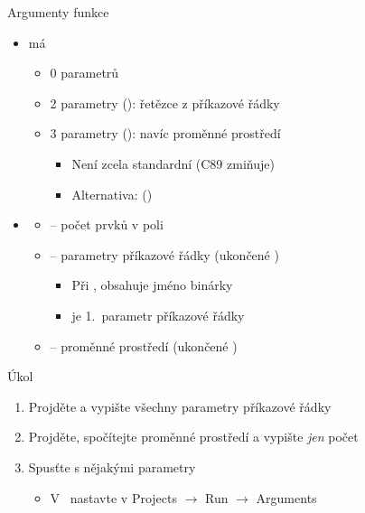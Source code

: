 \begin{frame}{Argumenty funkce }

  \begin{itemize}
    \item {} má
    \begin{itemize}
      \item 0 parametrů
      \item 2 parametry (): řetězce z příkazové řádky
      \item 3 parametry (): navíc proměnné
        prostředí
      \begin{itemize}
	\item Není zcela standardní (C89 zmiňuje)
	\item Alternativa:  ()
      \end{itemize}
    \end{itemize}

    \pause

    \item {}
    \begin{itemize}
      \item {} -- počet prvků v poli 
      \item {} -- parametry příkazové řádky (ukončené )
      \begin{itemize}
	\item Při ,  obsahuje jméno binárky
	\item {} je 1.\ parametr příkazové řádky
      \end{itemize}
      \item {} -- proměnné prostředí (ukončené )
    \end{itemize}
  \end{itemize}

\end{frame}

\begin{frame}{Úkol}

  \begin{enumerate}
    \item Projděte a vypište všechny parametry příkazové řádky
    \item Projděte, spočítejte proměnné prostředí a vypište \emph{jen} počet
    \item Spusťte s nějakými parametry
      \begin{itemize}
	\item V \qtcu\ nastavte v Projects $\rightarrow$ Run $\rightarrow$
	  Arguments
      \end{itemize}
  \end{enumerate}

\end{frame}

